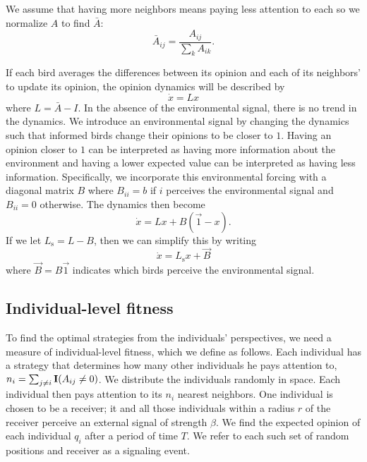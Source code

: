 \documentclass{article}
\begin{document}
We assume that having more neighbors means paying less attention to each so we normalize $A$ to find $\bar{A}$:
\begin{equation}
\bar{A}_{ij}=\frac{A_{ij}}{\sum_kA_{ik}}.
\end{equation}

If each bird averages the differences between its opinion and each of its neighbors' to update its opinion, the opinion dynamics will be described by 
\begin{equation}
\dot{x}=Lx
\end{equation}
where $L=\bar{A}-I$. In the absence of the environmental signal, there is no trend in the dynamics. We introduce an environmental signal by changing the dynamics such that informed birds change their opinions to be closer to $1$. Having an opinion closer to $1$ can be interpreted as having more information about the environment and having a lower expected value can be interpreted as having less information. Specifically, we incorporate this environmental forcing with a diagonal matrix $B$ where $B_{ii}=b$ if $i$ perceives the environmental signal and $B_{ii}=0$ otherwise. The dynamics then become
\begin{equation}
\dot{x}=Lx+B(\vec{1}-x).
\end{equation}
If we let $L_\text{s}=L-B$, then we can simplify this by writing
\begin{equation}
\dot{x}=L_\text{s}x+\vec{B}
\end{equation}
where $\vec{B}=B\vec{1}$ indicates which birds perceive the environmental signal.



\subsection{Individual-level fitness }
To find the optimal strategies from the individuals' perspectives, we need a measure of individual-level fitness, which we define as follows. Each individual has a strategy that determines how many other individuals he pays attention to, $n_i=\sum_{j\neq i}{\bf I}(A_{ij}\neq 0)$.  We distribute the individuals randomly in space.  Each individual then pays attention to its $n_i$ nearest neighbors.  One individual is chosen to be a receiver; it and all those individuals within a radius $r$ of the receiver perceive an external signal of strength $\beta$.  We find the expected opinion of each individual $q_i$ after a period of time $T$.  We refer to each such set of random positions and receiver as a signaling event. 
\end{document}
